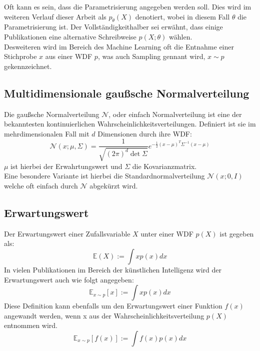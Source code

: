 Oft kann es sein, dass die Parametrisierung angegeben werden soll. Dies wird im weiteren Verlauf dieser Arbeit als $p_\theta(X)$ denotiert, wobei in diesem Fall $\theta$ die Parametrisierung ist. Der Vollständigkeithalber sei erwähnt, dass einige Publikationen eine alternative Schreibweise $p(X; \theta)$ wählen. \\
Desweiteren wird im Bereich des Machine Learning oft die Entnahme einer Stichprobe $x$ aus einer WDF $p$, was auch Sampling gennant wird, $x \sim p$ gekennzeichnet. 


\subsection{Multidimensionale gaußsche Normalverteilung}

Die gaußsche Normalverteilung $\mathcal N$, oder einfach Normalverteilung ist eine der bekanntesten kontinuierlichen Wahrscheinlichkeitsverteilungen. Definiert ist sie im mehrdimensionalen Fall mit $d$ Dimensionen durch ihre WDF:
\begin{equation}
    \mathcal N(x; \mu, \Sigma) = 
    \frac{1}{\sqrt{(2\pi)^d \det{\Sigma}}}
    e^{-\frac{1}{2}(x-\mu)^T \Sigma^{-1} (x-\mu)}
\end{equation}
$\mu$ ist hierbei der Erwahrtungswert und $\Sigma$ die Kovarianzmatrix. \\
Eine besondere Variante ist hierbei die Standardnormalverteilung $\mathcal N(x; 0, I)$ welche oft einfach durch $\mathcal N$ abgekürzt wird.

\subsection{Erwartungswert}

Der Erwartungswert einer Zufallsvariable $X$ unter einer WDF $p(X)$ ist gegeben als: 
\begin{equation}
    \mathbb E(X) := \int x p(x) dx
\end{equation}
In vielen Publikationen im Bereich der künstlichen Intelligenz wird der Erwartungswert auch wie folgt angegeben:
\begin{equation}
    \mathbb E_{x \sim p}[x] := \int x p(x) dx
\end{equation}
Diese Definition kann ebenfalls um den Erwartungswert einer Funktion $f(x)$ angewandt werden, wenn x aus der Wahrscheinlichkeitsverteilung $p(X)$ entnommen wird. 
\begin{equation}
    \mathbb E_{x \sim p}[f(x)] := \int f(x) p(x) dx
\end{equation}

